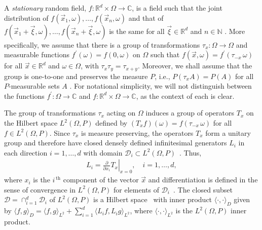 \documentclass{cmslatex}
\begin{document}
A \emph{stationary} random field, $f:\mathbb{R}^d\times\Omega\to\mathbb{C}$, is a
field such that the  
joint distribution of $f(\vec{x}_1,\omega),\ldots,f(\vec{x}_n,\omega)$ and that of
$f(\vec{x}_1+\vec{\xi},\omega),\ldots,f(\vec{x}_n+\vec{\xi},\omega)$ is the same for all
$\vec{\xi}\in\mathbb{R}^d$ and $n\in\mathbb{N}$
\cite{Golden:CMP-473,Papanicolaou:RF-835}.
More specifically, we assume that there is a group of transformations
$\tau_x:\Omega\to\Omega$ and measurable functions $f^{\prime}(\omega)=f(0,\omega)$ on $\Omega$ such that
$f(\vec{x},\omega)=f^\prime(\tau_{-x}\,\omega)$ for all $\vec{x}\in\mathbb{R}^d$ and
$\omega\in\Omega$, with $\tau_x\tau_y=\tau_{x+y}$.  Moreover, we shall assume that the
group is one-to-one and preserves the measure $P$, i.e., $P(\tau_xA)=P(A)$
for all $P$-measurable sets $A$
\cite{Golden:CMP-473,Papanicolaou:RF-835}. For notational simplicity,
we will not distinguish between the functions $f^\prime:\Omega\to\mathbb{C}$ and
$f:\mathbb{R}^d\times\Omega\to\mathbb{C}$, as the context of each is clear. 






The group of transformations $\tau_x$ acting on $\Omega$ induces a group of
operators $T_x$ on the Hilbert space $L^2(\Omega,P)$ defined by
$(T_xf)(\omega)=f(\tau_{-x}\,\omega)$ for all $f\in L^2(\Omega,P)$. Since $\tau_x$ is measure
preserving, the operators $T_x$ form a unitary group and therefore
have closed densely defined infinitesimal generators $L_i$ in each
direction $i=1,\ldots,d$ with domain $\mathscr{D}_i\subset
L^2(\Omega,P)$~\cite{Golden:CMP-473,Papanicolaou:RF-835}. Thus,   
%
\begin{align}\label{eq:Li}
  L_i=\left.\frac{\partial}{\partial x_i}T_x \right|_{x=0}, \quad i=1,\ldots,d,
\end{align}
%
where $x_i$
is the $i^{\,\text{th}}$ component of the vector
$\vec{x}$ and differentiation is defined in the sense of convergence
in $L^2(\Omega,P)$ for elements of
$\mathscr{D}_i$~\cite{Golden:CMP-473}. The closed subset 
$\mathscr{D}=\cap_{i=1}^d\mathscr{D}_i$ of $L^2(\Omega,P)$ is a Hilbert
space~\cite{Golden:CMP-473} with inner product $\langle \cdot,\cdot\rangle_D$ given by 
$\langle f,g\rangle_D=\langle f,g\rangle_{L^2}+\sum_{i=1}^d\langle L_if,L_ig\rangle_{L^2}$, where
$\langle\cdot,\cdot\rangle_{L^2}$ is the $L^2(\Omega,P)$ inner product. 
\end{document}
